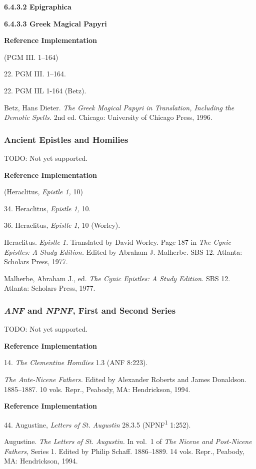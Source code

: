 \documentclass[a4paper]{article}
\newenvironment{refimp}{%
  \begin{minipage}{\linewidth}
    \setlength{\parskip}{1ex}
    \textbf{Reference Implementation}\par
    \nobreak
    \color{reference-colour}
}{\end{minipage}}
\begin{document}
\textbf{6.4.3.2 Epigraphica}

\textbf{6.4.3.3 Greek Magical Papyri}

\begin{refimp}
  (PGM III. 1–164)

  22. PGM III. 1–164.

  22. PGM IIL 1-164 (Betz).

  \hangindent\bibindent Betz, Hans Dieter. \emph{The Greek Magical Papyri in
  Translation, Including the Demotic Spells.} 2nd ed. Chicago: University of
  Chicago Press, 1996.
\end{refimp}

\subsubsection{Ancient Epistles and Homilies}

TODO: Not yet supported.

\begin{refimp}
  (Heraclitus, \emph{Epistle 1,} 10)

  34. Heraclitus, \emph{Epistle 1,} 10.

  36. Heraclitus, \emph{Epistle 1,} 10 (Worley).

  \hangindent\bibindent Heraclitus. \emph{Epistle 1.} Translated by David
  Worley. Page 187 in \emph{The Cynic Epistles: A Study Edition.} Edited by
  Abraham J. Malherbe. SBS 12. Atlanta: Scholars Press, 1977.

  \hangindent\bibindent Malherbe, Abraham J., ed. \emph{The Cynic Epistles: A
  Study Edition.} SBS 12. Atlanta: Scholars Press, 1977.
\end{refimp}

\subsubsection{\emph{ANF} and \emph{NPNF}, First and Second Series}

TODO: Not yet supported.

\begin{refimp}
  14. \emph{The Clementine Homilies} 1.3 (ANF 8:223).

  \hangindent\bibindent \emph{The Ante-Nicene Fathers.} Edited by Alexander
  Roberts and James Donaldson. 1885–1887. 10 vols. Repr., Peabody, MA:
  Hendrickson, 1994.
\end{refimp}

\begin{refimp}
  44. Augustine, \emph{Letters of St. Augustin} 28.3.5
  (NPNF\textsuperscript{1} 1:252).
  
  \hangindent\bibindent Augustine. \emph{The Letters of St. Augustin.} In
  vol.~1 of \emph{The Nicene and Post-Nicene Fathers,} Series 1. Edited by
  Philip Schaff. 1886–1889. 14 vols. Repr., Peabody, MA: Hendrickson, 1994.
\end{refimp}
\end{document}
